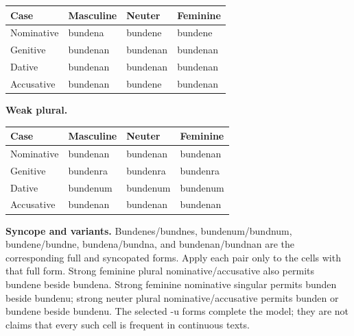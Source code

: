 \par\begingroup
\fontsize{10.5}{13.2}\selectfont
\setlength{\LTleft}{0pt}\setlength{\LTright}{\fill}
\noindent
\begin{tabular}{@{}>{\raggedright\arraybackslash}p{22.0mm}>{\raggedright\arraybackslash}p{31.188mm}>{\raggedright\arraybackslash}p{31.188mm}>{\raggedright\arraybackslash}p{31.188mm}@{}}
\toprule
\textbf{Case} & \textbf{Masculine} & \textbf{Neuter} & \textbf{Feminine} \\
\midrule
Nominative & bundena & bundene & bundene \\
Genitive & bundenan & bundenan & bundenan \\
Dative & bundenan & bundenan & bundenan \\
Accusative & bundenan & bundene & bundenan \\
\bottomrule
\end{tabular}
\par\endgroup
\textbf{Weak plural.}

\par\begingroup
\fontsize{10.5}{13.2}\selectfont
\setlength{\LTleft}{0pt}\setlength{\LTright}{\fill}
\noindent
\begin{tabular}{@{}>{\raggedright\arraybackslash}p{22.0mm}>{\raggedright\arraybackslash}p{31.188mm}>{\raggedright\arraybackslash}p{31.188mm}>{\raggedright\arraybackslash}p{31.188mm}@{}}
\toprule
\textbf{Case} & \textbf{Masculine} & \textbf{Neuter} & \textbf{Feminine} \\
\midrule
Nominative & bundenan & bundenan & bundenan \\
Genitive & bundenra & bundenra & bundenra \\
Dative & bundenum & bundenum & bundenum \\
Accusative & bundenan & bundenan & bundenan \\
\bottomrule
\end{tabular}
\par\endgroup
\textbf{Syncope and variants.} Bundenes/\allowbreak{}bundnes, bundenum/\allowbreak{}bundnum, bundene/\allowbreak{}bundne, bundena/\allowbreak{}bundna, and bundenan/\allowbreak{}bundnan are the corresponding full and syncopated forms. Apply each pair only to the cells with that full form. Strong feminine plural nominative/\allowbreak{}accusative also permits bundene beside bundena. Strong feminine nominative singular permits bunden beside bundenu; strong neuter plural nominative/\allowbreak{}accusative permits bunden or bundene beside bundenu. The selected -u forms complete the model; they are not claims that every such cell is frequent in continuous texts.

